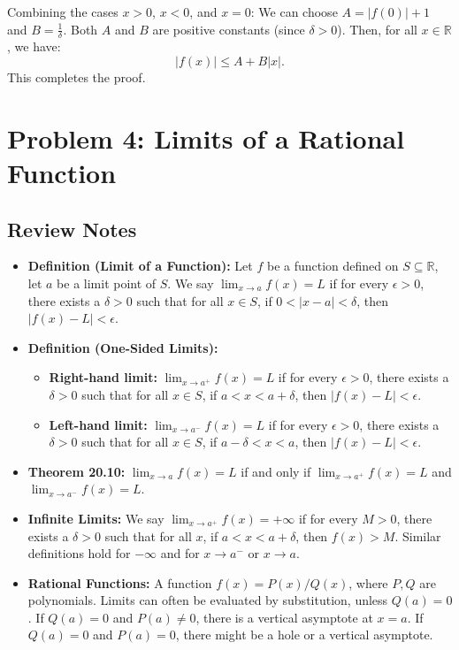 \documentclass{article}
\newcommand{\R}{\mathbb{R}}
\begin{document}
Combining the cases \(x > 0\), \(x < 0\), and \(x = 0\):
We can choose \(A = |f(0)| + 1\) and \(B = \frac{1}{\delta}\). Both \(A\) and \(B\) are positive constants (since \(\delta > 0\)).
Then, for all \(x \in \R\), we have:
\[ |f(x)| \le A + B|x|. \]
This completes the proof.

\section*{Problem 4: Limits of a Rational Function}

\subsection*{Review Notes}

\begin{itemize}
    \item \textbf{Definition (Limit of a Function):} Let \(f\) be a function defined on \(S \subseteq \R\), let \(a\) be a limit point of \(S\). We say \(\lim_{x\to a} f(x) = L\) if for every \(\epsilon > 0\), there exists a \(\delta > 0\) such that for all \(x \in S\), if \(0 < |x-a| < \delta\), then \(|f(x) - L| < \epsilon\).
    \item \textbf{Definition (One-Sided Limits):}
        \begin{itemize}
            \item \textbf{Right-hand limit:} \(\lim_{x\to a^+} f(x) = L\) if for every \(\epsilon > 0\), there exists a \(\delta > 0\) such that for all \(x \in S\), if \(a < x < a+\delta\), then \(|f(x) - L| < \epsilon\).
            \item \textbf{Left-hand limit:} \(\lim_{x\to a^-} f(x) = L\) if for every \(\epsilon > 0\), there exists a \(\delta > 0\) such that for all \(x \in S\), if \(a-\delta < x < a\), then \(|f(x) - L| < \epsilon\).
        \end{itemize}
    \item \textbf{Theorem 20.10:} \(\lim_{x\to a} f(x) = L\) if and only if \(\lim_{x\to a^+} f(x) = L\) and \(\lim_{x\to a^-} f(x) = L\).
    \item \textbf{Infinite Limits:} We say \(\lim_{x\to a^+} f(x) = +\infty\) if for every \(M > 0\), there exists a \(\delta > 0\) such that for all \(x\), if \(a < x < a+\delta\), then \(f(x) > M\). Similar definitions hold for \(-\infty\) and for \(x \to a^-\) or \(x \to a\).
    \item \textbf{Rational Functions:} A function \(f(x) = P(x)/Q(x)\), where \(P, Q\) are polynomials. Limits can often be evaluated by substitution, unless \(Q(a)=0\). If \(Q(a)=0\) and \(P(a) \ne 0\), there is a vertical asymptote at \(x=a\). If \(Q(a)=0\) and \(P(a) = 0\), there might be a hole or a vertical asymptote.
\end{itemize}
\end{document}
